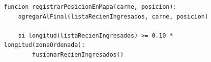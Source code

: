 \begin{lstlisting}[style=pseudocodigo]
funcion registrarPosicionEnMapa(carne, posicion):
    agregarAlFinal(listaRecienIngresados, carne, posicion)

    si longitud(listaRecienIngresados) >= 0.10 * longitud(zonaOrdenada):
        fusionarRecienIngresados()
\end{lstlisting}
